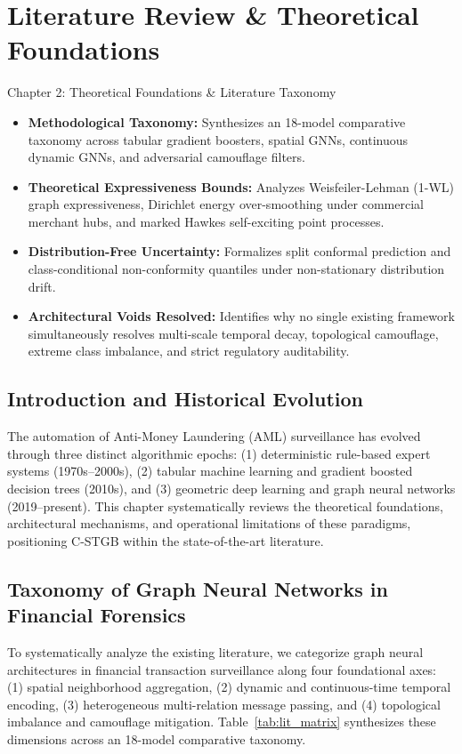 \chapter{Literature Review \& Theoretical Foundations}
\label{ch:literature}

\begin{takeawaybox}{Chapter 2: Theoretical Foundations \& Literature Taxonomy}
\begin{itemize}\setlength{\itemsep}{1pt}
  \item \textbf{Methodological Taxonomy:} Synthesizes an 18-model comparative taxonomy across tabular gradient boosters, spatial GNNs, continuous dynamic GNNs, and adversarial camouflage filters.
  \item \textbf{Theoretical Expressiveness Bounds:} Analyzes Weisfeiler-Lehman (1-WL) graph expressiveness, Dirichlet energy over-smoothing under commercial merchant hubs, and marked Hawkes self-exciting point processes.
  \item \textbf{Distribution-Free Uncertainty:} Formalizes split conformal prediction and class-conditional non-conformity quantiles under non-stationary distribution drift.
  \item \textbf{Architectural Voids Resolved:} Identifies why no single existing framework simultaneously resolves multi-scale temporal decay, topological camouflage, extreme class imbalance, and strict regulatory auditability.
\end{itemize}
\end{takeawaybox}


\section{Introduction and Historical Evolution}
The automation of Anti-Money Laundering (AML) surveillance has evolved through three distinct algorithmic epochs: (1) deterministic rule-based expert systems (1970s--2000s), (2) tabular machine learning and gradient boosted decision trees (2010s), and (3) geometric deep learning and graph neural networks (2019--present). This chapter systematically reviews the theoretical foundations, architectural mechanisms, and operational limitations of these paradigms, positioning C-STGB within the state-of-the-art literature.

\section{Taxonomy of Graph Neural Networks in Financial Forensics}
To systematically analyze the existing literature, we categorize graph neural architectures in financial transaction surveillance along four foundational axes: (1) spatial neighborhood aggregation, (2) dynamic and continuous-time temporal encoding, (3) heterogeneous multi-relation message passing, and (4) topological imbalance and camouflage mitigation. Table~\ref{tab:lit_matrix} synthesizes these dimensions across an 18-model comparative taxonomy.


